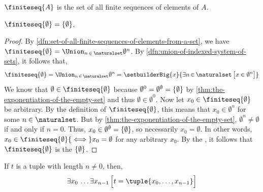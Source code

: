 \begin{rem}
    \( \finiteseq{A} \) is the set of all finite sequences of elements of \( A \).
\end{rem}

\begin{thm}
     \label{thm:seq-empty-set-is-the-singleton-containing-the-empty-set}
    \( \finiteseq{\emptyset} = \mleft\{ \emptyset \mright\} \).
\end{thm}

\begin{proof}
    By \cref{dfn:set-of-all-finite-sequences-of-elements-from-a-set}, we have \( \finiteseq{\emptyset} = \Union_{n \,\in\, \naturalset} \emptyset^{n} \).
    By \cref{dfn:union-of-indexed-system-of-sets}, it follows that,
    \begin{equation*}
        \finiteseq{\emptyset} = \Union_{n \,\in\, \naturalset} \emptyset^{n} = \setbuilderBig{x}{\exists n\,{\in}\,\naturalset \, \big[ x \in \emptyset^{n} \big]}
    \end{equation*}
    We know that \( \emptyset \in \finiteseq{\emptyset} \)
    because \( \emptyset^{0} = \emptyset^{\emptyset} = \mleft\{ \emptyset \mright\} \) by \cref{thm:the-exponentiation-of-the-empty-set}
    and thus \( \emptyset \in \emptyset^{0} \).
    Now let \( x_{0} \in \finiteseq{\emptyset} \) be arbitrary.
    By the definition of \( \finiteseq{\emptyset} \),
    this means that \( x_{0} \in \emptyset^{n} \) for some \( n \in \naturalset \). But by \cref{thm:the-exponentiation-of-the-empty-set},
    \( \emptyset^{n} \neq \emptyset \) if and only if \( n = 0 \). Thus, \( x_{0} \in \emptyset^{\emptyset} = \mleft\{ \emptyset \mright\} \),
    so necessarily \( x_{0} = \emptyset \). In other words, \( x_{0} \in \finiteseq{\emptyset} {\iff} x_{0} = \emptyset \) for any arbitrary \( x_{0} \).
    By the , it follows that \( \finiteseq{\emptyset} \) is the  \( \mleft\{ \emptyset \mright\} \).
\end{proof}

\begin{thm}
    \label{thm:every-non-zero-tuple-is-expressible-in-sequence-notation}
    If \( t \) is a tuple with length \( n \neq 0 \), then,
    \begin{equation*}
        \exists x_{0} \, \dots \exists x_{n-1} \, \Big[ t = \tuple{x_{0}, \dots, x_{n-1}} \Big]
    \end{equation*}
\end{thm}

